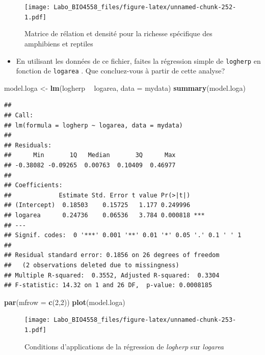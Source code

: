 \documentclass[12pt,]{book}
\newenvironment{Shaded}{\begin{snugshade}}{\end{snugshade}}
\newcommand{\DataTypeTok}[1]{\textcolor[rgb]{0.13,0.29,0.53}{#1}}
\newcommand{\DecValTok}[1]{\textcolor[rgb]{0.00,0.00,0.81}{#1}}
\newcommand{\KeywordTok}[1]{\textcolor[rgb]{0.13,0.29,0.53}{\textbf{#1}}}
\newcommand{\NormalTok}[1]{#1}
\newcommand{\OperatorTok}[1]{\textcolor[rgb]{0.81,0.36,0.00}{\textbf{#1}}}
\newcommand{\StringTok}[1]{\textcolor[rgb]{0.31,0.60,0.02}{#1}}
\providecommand{\tightlist}{%
  \setlength{\itemsep}{0pt}\setlength{\parskip}{0pt}}
\begin{document}
\begin{figure}
\centering
\texttt{[image: Labo\_BIO4558\_files/figure-latex/unnamed-chunk-252-1.pdf]}
\caption{\label{fig:unnamed-chunk-252}Matrice de rélation et densité pour la richesse spécifique des amphibiens et reptiles}
\end{figure}

\begin{itemize}
\tightlist
\item
  En utilisant les données de ce fichier, faites la régression simple de \texttt{logherp} en fonction de \texttt{logarea} . Que concluez-vous à partir de cette analyse?
\end{itemize}

\begin{Shaded}
\begin{Highlighting}[]
\NormalTok{model.loga <-}\StringTok{ }\KeywordTok{lm}\NormalTok{(logherp }\OperatorTok{~}\StringTok{ }\NormalTok{logarea, }\DataTypeTok{data =}\NormalTok{ mydata)}
\KeywordTok{summary}\NormalTok{(model.loga)}
\end{Highlighting}
\end{Shaded}

\begin{verbatim}
## 
## Call:
## lm(formula = logherp ~ logarea, data = mydata)
## 
## Residuals:
##      Min       1Q   Median       3Q      Max 
## -0.38082 -0.09265  0.00763  0.10409  0.46977 
## 
## Coefficients:
##             Estimate Std. Error t value Pr(>|t|)    
## (Intercept)  0.18503    0.15725   1.177 0.249996    
## logarea      0.24736    0.06536   3.784 0.000818 ***
## ---
## Signif. codes:  0 '***' 0.001 '**' 0.01 '*' 0.05 '.' 0.1 ' ' 1
## 
## Residual standard error: 0.1856 on 26 degrees of freedom
##   (2 observations deleted due to missingness)
## Multiple R-squared:  0.3552, Adjusted R-squared:  0.3304 
## F-statistic: 14.32 on 1 and 26 DF,  p-value: 0.0008185
\end{verbatim}

\begin{Shaded}
\begin{Highlighting}[]
\KeywordTok{par}\NormalTok{(}\DataTypeTok{mfrow =} \KeywordTok{c}\NormalTok{(}\DecValTok{2}\NormalTok{,}\DecValTok{2}\NormalTok{))}
\KeywordTok{plot}\NormalTok{(model.loga)}
\end{Highlighting}
\end{Shaded}

\begin{figure}
\centering
\texttt{[image: Labo\_BIO4558\_files/figure-latex/unnamed-chunk-253-1.pdf]}
\caption{\label{fig:unnamed-chunk-253}Conditions d'applications de la régression de \emph{logherp} sur \emph{logarea}}
\end{figure}
\end{document}
